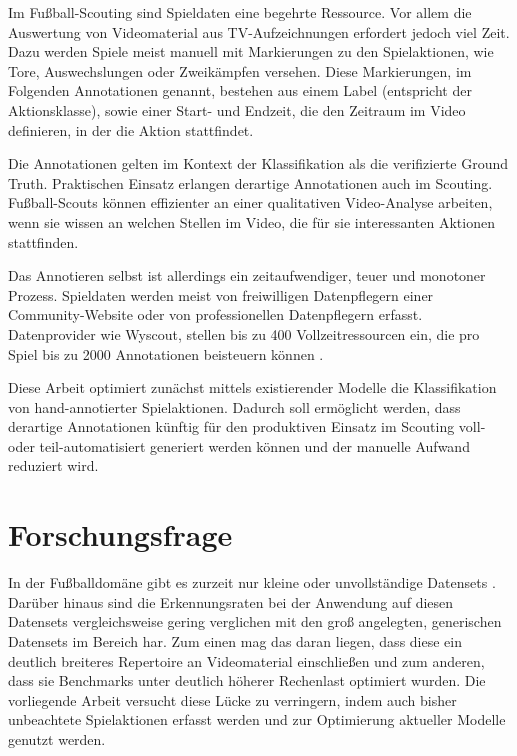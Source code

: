 Im Fußball-Scouting sind Spieldaten eine begehrte Ressource.
Vor allem die Auswertung von Videomaterial aus TV-Aufzeichnungen erfordert jedoch viel Zeit.
Dazu werden Spiele meist manuell mit Markierungen zu den Spielaktionen, wie Tore, Auswechslungen oder Zweikämpfen versehen.
Diese Markierungen, im Folgenden Annotationen genannt, bestehen aus einem Label (entspricht der Aktionsklasse), sowie einer Start- und Endzeit, die den Zeitraum im Video definieren, in der die Aktion stattfindet.

Die Annotationen gelten im Kontext der Klassifikation als die \sog verifizierte Ground Truth.
Praktischen Einsatz erlangen derartige Annotationen auch im Scouting.
Fußball-Scouts können \zB effizienter an einer qualitativen Video-Analyse arbeiten, wenn sie wissen an welchen Stellen im Video, die für sie interessanten Aktionen stattfinden.

Das Annotieren selbst ist allerdings ein zeitaufwendiger, teuer und monotoner Prozess.
Spieldaten werden meist von freiwilligen Datenpflegern einer Community-Website oder von professionellen Datenpflegern erfasst.
Datenprovider wie Wyscout, stellen bis zu 400 Vollzeitressourcen ein, die pro Spiel bis zu 2000 Annotationen beisteuern können \cite{Jiang19}.

Diese Arbeit optimiert zunächst mittels existierender Modelle die Klassifikation von hand-annotierter Spielaktionen.
Dadurch soll ermöglicht werden, dass derartige Annotationen künftig für den produktiven Einsatz im Scouting voll- oder teil-automatisiert generiert werden können und der manuelle Aufwand reduziert wird.

\section{Forschungsfrage}
\label{sec:forschungsfrage}

In der Fußballdomäne gibt es zurzeit nur kleine oder unvollständige Datensets \cite{Giancola18} \cite{Jiang19}.
Darüber hinaus sind die Erkennungsraten bei der Anwendung auf diesen Datensets vergleichsweise gering verglichen mit den groß angelegten, generischen Datensets \cite{Kay17} \cite{Karpathy14} im Bereich \gls{har}.
Zum einen mag das daran liegen, dass diese ein deutlich breiteres Repertoire an Videomaterial einschließen und zum anderen, dass sie Benchmarks unter deutlich höherer Rechenlast optimiert wurden.
Die vorliegende Arbeit versucht diese Lücke zu verringern, indem auch bisher unbeachtete Spielaktionen erfasst werden und zur Optimierung aktueller Modelle genutzt werden.

